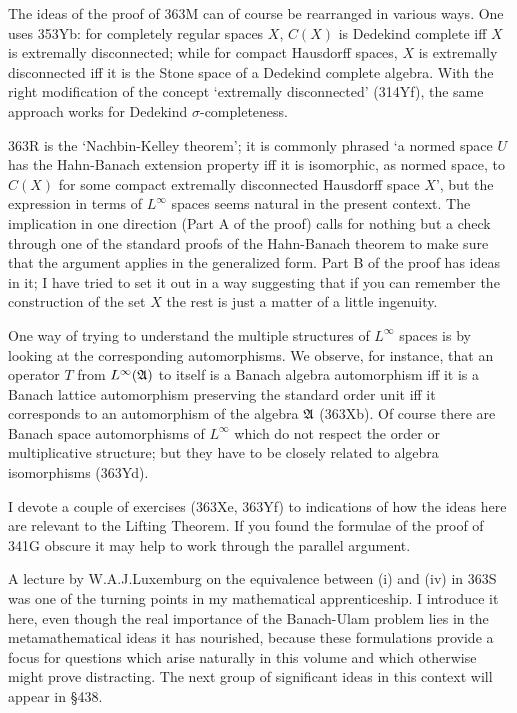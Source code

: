{The ideas of the proof of 363M can of course be rearranged in various
ways.   One uses 353Yb:  for completely regular spaces $X$, $C(X)$
is Dedekind complete iff $X$ is extremally disconnected;  while for
compact Hausdorff spaces, $X$ is extremally disconnected iff it is the
Stone space of a Dedekind complete algebra.   With the right
modification of the concept `extremally disconnected' (314Yf), the
same approach works for Dedekind $\sigma$-completeness.

363R is the `Nachbin-Kelley theorem';  it is
commonly phrased `a normed space $U$ has the
Hahn-Banach extension property iff it is isomorphic, as normed space, to
$C(X)$ for some compact extremally disconnected Hausdorff space $X$',
but the expression in terms of $L^{\infty}$ spaces seems natural in the
present context.   The implication in one direction (Part A of the
proof) calls for nothing but a check through one of the standard proofs
of the Hahn-Banach theorem to make sure that the argument applies in the
generalized form.   Part B of the proof has ideas in it;  I have tried
to set it out in a way suggesting that if you can remember the
construction of the set $X$ the rest is just a matter of a little
ingenuity.

One way of trying to understand the multiple structures of $L^{\infty}$
spaces is by looking at the corresponding automorphisms.   We observe,
for instance, that an operator $T$ from $L^{\infty}(\frak A)$ to itself
is a Banach algebra automorphism iff it is a Banach lattice automorphism
preserving the standard order unit iff it corresponds to an automorphism
of the algebra $\frak A$ (363Xb).   Of course there are Banach space
automorphisms of $L^{\infty}$ which do not respect the order or
multiplicative structure;  but they have to be closely related to
algebra isomorphisms (363Yd).

I devote a couple of exercises (363Xe, 363Yf) to indications of how the
ideas here are relevant to the Lifting Theorem.   If you found the
formulae of the proof of 341G obscure it may help to work through the
parallel argument.

A lecture by W.A.J.Luxemburg on the equivalence between (i) and (iv) in
363S was one of the turning points in my mathematical apprenticeship.
I introduce it here, even though the real importance of the Banach-Ulam
problem lies in the metamathematical ideas it has nourished, because
these formulations provide a focus for questions which arise naturally
in this volume and which otherwise might prove distracting.   The next
group of significant ideas in this context will appear in \S438.
}%

\discrpage

